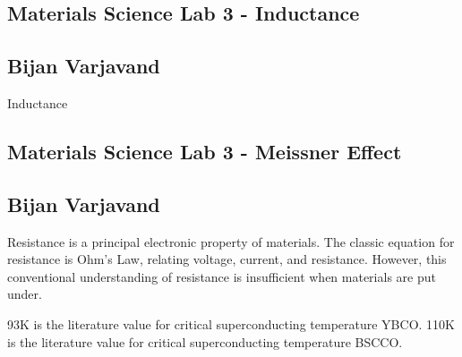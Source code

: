 \documentclass{article}
\begin{document}
\begin{center}
\section*{Materials Science Lab 3 - Inductance}
\subsection*{Bijan Varjavand}
\end{center}

Inductance

\clearpage
\begin{center}
\section*{Materials Science Lab 3 - Meissner Effect}
\subsection*{Bijan Varjavand}
\end{center}

Resistance is a principal electronic property of materials. The classic equation for resistance is Ohm's Law, relating voltage, current, and resistance. However, this conventional understanding of resistance is insufficient when materials are put under.

93K is the literature value for critical superconducting temperature YBCO. 110K is the literature value for critical superconducting temperature BSCCO.
\end{document}
